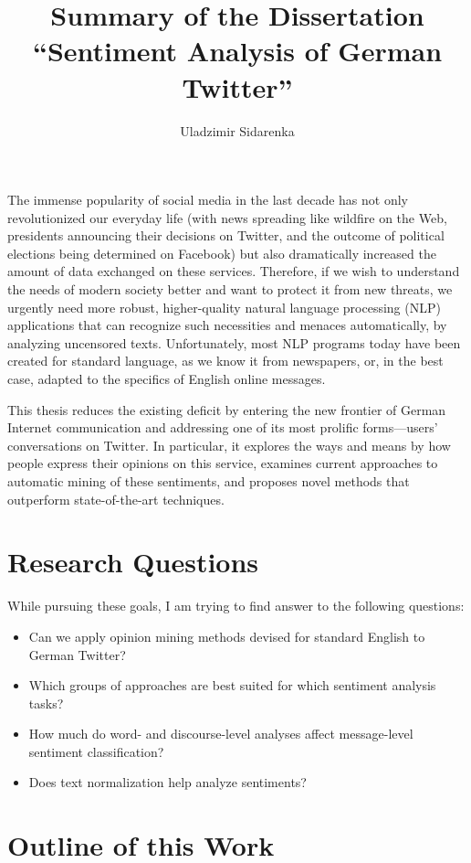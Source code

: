 \documentclass[11pt]{article}
\author{Uladzimir Sidarenka}
\title{  {\large Summary of the Dissertation}\\[0.5em]
  {\Large ``Sentiment Analysis of German Twitter''}}
\date{\vspace{-3ex}}
\begin{document}
\maketitle

The immense popularity of social media in the last decade has not only
revolutionized our everyday life (with news spreading like wildfire on
the Web, presidents announcing their decisions on Twitter, and the
outcome of political elections being determined on Facebook) but also
dramatically increased the amount of data exchanged on these services.
Therefore, if we wish to understand the needs of modern society better
and want to protect it from new threats, we urgently need more robust,
higher-quality natural language processing (NLP) applications that can
recognize such necessities and menaces automatically, by analyzing
uncensored texts.  Unfortunately, most NLP programs today have been
created for standard language, as we know it from newspapers, or, in
the best case, adapted to the specifics of English online messages.

This thesis reduces the existing deficit by entering the new frontier
of German Internet communication and addressing one of its most
prolific forms---users' conversations on Twitter.  In particular, it
explores the ways and means by how people express their opinions on
this service, examines current approaches to automatic mining of these
sentiments, and proposes novel methods that outperform
state-of-the-art techniques.

\section{Research Questions}

While pursuing these goals, I am trying to find answer to the
following questions:

\begin{itemize}
\item Can we apply opinion mining methods devised for standard English
  to German Twitter?
\item Which groups of approaches are best suited for which sentiment
  analysis tasks?
\item How much do word- and discourse-level analyses affect
  message-level sentiment classification?
\item Does text normalization help analyze sentiments?
\end{itemize}

\section{Outline of this Work}
\end{document}
